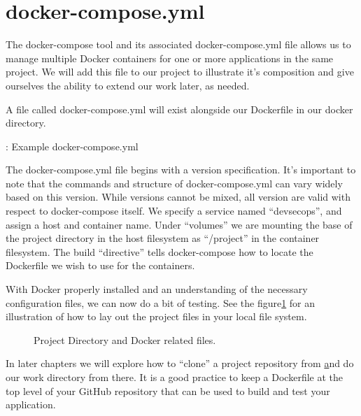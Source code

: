 \section{docker-compose.yml}
\justifying
The docker-compose tool and its associated docker-compose.yml file allows us to manage multiple Docker containers for
one or more applications in the same project. We will add this file to our project to illustrate it's
composition and give ourselves the ability to extend our work later, as needed.

\justifying
A file called docker-compose.yml will exist
alongside our Dockerfile in our docker directory.

\begin{mybox}{\thetcbcounter: Example docker-compose.yml}
  
\end{mybox}

\justifying
The docker-compose.yml file begins with a version specification. It's important to note that the commands and structure
of docker-compose.yml can vary widely based on this version. While versions cannot be mixed, all version are valid with
respect to docker-compose itself. We specify a service named ``devsecops'', and assign a host and container name. Under
``volumes'' we are mounting the base of the project directory in the host
filesystem as ``/project'' in the container filesystem. The build
``directive'' tells docker-compose how to locate the Dockerfile we wish to use for the containers.

\justifying
With Docker properly installed and an understanding of the necessary configuration files, we can now do a bit of testing.
See the figure\ref{dockerdirectory} for an illustration of how to lay out the project files in your local file system.

\begin{figure}[!htb]
  \centering
  
  \caption{Project Directory and Docker related files.}
\label{dockerdirectory}
\end{figure}


\justifying
In later chapters we will explore how to ``clone'' a project repository from \href{github.com} and do our work directory
from there. It is a good practice to keep a Dockerfile at the top level of your GitHub repository that can be used to
build and test your application.


